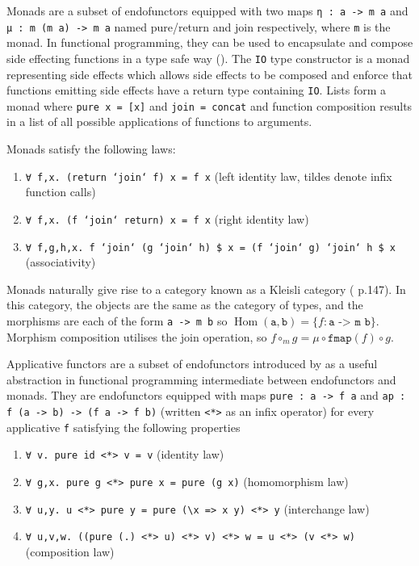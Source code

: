 \documentclass[]{report}
\begin{document}
Monads are a subset of endofunctors equipped with two maps \texttt{η : a -> m a} and \texttt{μ : m (m a) -> m a} named pure/return and join respectively, where \texttt{m} is the monad. In functional programming, they can be used to encapsulate and compose side effecting functions in a type safe way (\cite{moggi1991notions}). The \texttt{IO} type constructor is a monad representing side effects which allows side effects to be composed and enforce that functions emitting side effects have a return type containing \texttt{IO}. Lists form a monad where \texttt{pure x = [x]} and \texttt{join = concat} and function composition results in a list of all possible applications of functions to arguments.

Monads satisfy the following laws:
\begin{enumerate}
	\item \texttt{∀ f,x. (return `join` f) x = f x} (left identity law, tildes denote infix function calls)
	\item \texttt{∀ f,x. (f `join` return) x = f x} (right identity law)
	\item \texttt{∀ f,g,h,x. f `join` (g `join` h) \$ x = (f `join` g) `join` h \$ x} (associativity)
\end{enumerate}

Monads naturally give rise to a category known as a Kleisli category (\cite{mac1970categories} p.147). In this category, the objects are the same as the category of types, and the morphisms are each of the form \texttt{a -> m b} so $\operatorname{Hom}(\texttt{a},\texttt{b})=\{ f : \texttt{a -> m b} \}$. Morphism composition utilises the join operation, so $f\circ_m g = \mu\circ \texttt{fmap}(f)\circ g$.

Applicative functors are a subset of endofunctors introduced by \cite{mcbride2008applicative} as a useful abstraction in functional programming intermediate between endofunctors and monads. They are endofunctors equipped with maps \texttt{pure : a -> f a} and \texttt{ap : f (a -> b) -> (f a -> f b)} (written \texttt{<*>} as an infix operator) for every applicative \texttt{f} satisfying the following properties

\begin{enumerate}
	\item \texttt{∀ v. pure id <*> v = v} (identity law)
	\item \texttt{∀ g,x. pure g <*> pure x = pure (g x)} (homomorphism law)
	\item \texttt{∀ u,y. u <*> pure y = pure (\textbackslash{}x => x y) <*> y} (interchange law)
	\item \texttt{∀ u,v,w. ((pure (.) <*> u) <*> v) <*> w = u <*> (v <*> w)} (composition law)
\end{enumerate}
\end{document}
